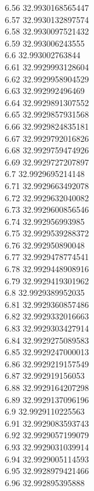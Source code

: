{6.56	32.9930168565447\\
6.57	32.9930132897574\\
6.58	32.9930097521432\\
6.59	32.993006243555\\
6.6	32.993002763844\\
6.61	32.9929993128604\\
6.62	32.9929958904529\\
6.63	32.992992496469\\
6.64	32.9929891307552\\
6.65	32.9929857931568\\
6.66	32.9929824835181\\
6.67	32.9929792016826\\
6.68	32.9929759474926\\
6.69	32.9929727207897\\
6.7	32.9929695214148\\
6.71	32.9929663492078\\
6.72	32.9929632040082\\
6.73	32.9929600856546\\
6.74	32.992956993985\\
6.75	32.9929539288372\\
6.76	32.992950890048\\
6.77	32.9929478774541\\
6.78	32.9929448908916\\
6.79	32.9929419301962\\
6.8	32.9929389952035\\
6.81	32.9929360857486\\
6.82	32.9929332016663\\
6.83	32.9929303427914\\
6.84	32.9929275089583\\
6.85	32.9929247000013\\
6.86	32.9929219157549\\
6.87	32.992919156053\\
6.88	32.9929164207298\\
6.89	32.9929137096196\\
6.9	32.9929110225563\\
6.91	32.9929083593743\\
6.92	32.9929057199079\\
6.93	32.9929031039914\\
6.94	32.9929005114593\\
6.95	32.9928979421466\\
6.96	32.992895395888\\
}
